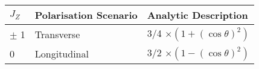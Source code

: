 \begin{tabular}{|l l l |}

\hline

$J_{Z}$ & Polarisation Scenario & Analytic Description \\ \hline
$\pm$ 1  & Transverse &  3/4 $\times (1 + (\cos \theta)^{2})$ \\ \hline
0  & Longitudinal & 3/2 $\times (1- (\cos \theta)^{2})$ \\ \hline

\end{tabular}

